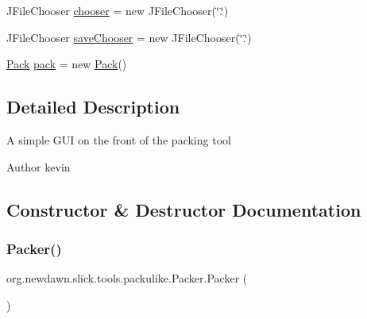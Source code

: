 \begin{DoxyCompactItemize}
\item 
J\+File\+Chooser \mbox{\hyperlink{classorg_1_1newdawn_1_1slick_1_1tools_1_1packulike_1_1_packer_aee4fbd6c801ae2b56690fc2994e73e52}{chooser}} = new J\+File\+Chooser(\char`\"{}.\char`\"{})
\item 
J\+File\+Chooser \mbox{\hyperlink{classorg_1_1newdawn_1_1slick_1_1tools_1_1packulike_1_1_packer_a29ef57b7ec0b9ffa079a40890b9ac78b}{save\+Chooser}} = new J\+File\+Chooser(\char`\"{}.\char`\"{})
\item 
\mbox{\hyperlink{classorg_1_1newdawn_1_1slick_1_1tools_1_1packulike_1_1_pack}{Pack}} \mbox{\hyperlink{classorg_1_1newdawn_1_1slick_1_1tools_1_1packulike_1_1_packer_a7e75cbdd91211b7a08a6a5a587575fe6}{pack}} = new \mbox{\hyperlink{classorg_1_1newdawn_1_1slick_1_1tools_1_1packulike_1_1_pack}{Pack}}()
\end{DoxyCompactItemize}


\subsection{Detailed Description}
A simple G\+UI on the front of the packing tool

\begin{DoxyAuthor}{Author}
kevin 
\end{DoxyAuthor}


\subsection{Constructor \& Destructor Documentation}
\mbox{\label{classorg_1_1newdawn_1_1slick_1_1tools_1_1packulike_1_1_packer_aea273a706568d7f6e6621a38d3ad694d}} 
\subsubsection{\texorpdfstring{Packer()}{Packer()}}
{\footnotesize\ttfamily org.\+newdawn.\+slick.\+tools.\+packulike.\+Packer.\+Packer (\begin{DoxyParamCaption}{ }\end{DoxyParamCaption})\hspace{0.3cm}{\ttfamily [inline]}}

